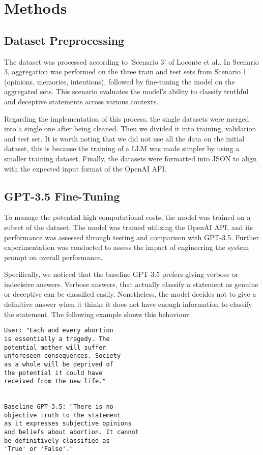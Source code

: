\documentclass[10pt,twocolumn,letterpaper]{article}
\begin{document}
\section{Methods}

\subsection{Dataset Preprocessing}


The dataset was processed according to 'Scenario 3' of Loconte et al.\cite{Loconte}.
In Scenario 3, aggregation was performed on the three train and test sets from Scenario 1 (opinions, memories, intentions), followed by fine-tuning the model on the aggregated sets. 
This scenario evaluates the model's ability to classify truthful and deceptive statements across various contexts.

Regarding the implementation of this process, the single datasets were merged into a single one after being cleaned. Then we divided it into training, validation and test set.
It is worth noting that we did not use all the data on the initial dataset, this is because the training of a LLM was made simpler by using a smaller training dataset.
Finally, the datasets were formatted into JSON to align with the expected input format of the OpenAI API.



\subsection{GPT-3.5 Fine-Tuning}
To manage the potential high computational costs, the model was trained on a subset of the dataset.
The model was trained utilizing the OpenAI API, and its performance was assessed through 
testing and comparison with GPT-3.5. Further experimentation was conducted to assess 
the impact of engineering the system prompt on overall performance.

Specifically, we noticed that the baseline GPT-3.5 prefers giving verbose or indecisive answers.
Verbose answers, that actually classify a statement as genuine or deceptive can be classified easily.
Nonetheless, the model decides not to give a definitive answer when it thinks it does not have enough information to classify the statement.
The following example shows this behaviour.

\begin{verbatim}
User: "Each and every abortion 
is essentially a tragedy. The 
potential mother will suffer 
unforeseen consequences. Society
as a whole will be deprived of 
the potential it could have 
received from the new life."

   
Baseline GPT-3.5: "There is no 
objective truth to the statement 
as it expresses subjective opinions
and beliefs about abortion. It cannot 
be definitively classified as 
'True' or 'False'."
\end{verbatim}   
\end{document}
